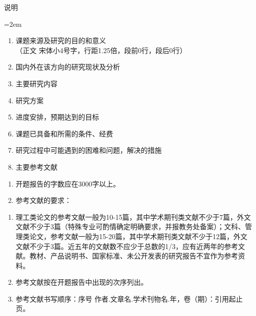 {%
\newpage

\thispagestyle{empty}
\vspace*{2em}
\begin{center}
  \heiti{}说\hspace{3em}明
\end{center}
\vspace*{40pt}
	\renewcommand{\arraystretch}{1.25}
    {\heiti{}
    \hangindent=2em
    \begin{enumerate}[leftmargin=36pt]
	\item 课题来源及研究的目的和意义\\ {\songti {}（正文  宋体小4号字，行距1.25倍，段前0行，段后0行）}
	\item 国内外在该方向的研究现状及分析
	\item 主要研究内容
	\item 研究方案
	\item 进度安排，预期达到的目标
	\item 课题已具备和所需的条件、经费
	\item 研究过程中可能遇到的困难和问题，解决的措施
	\item 主要参考文献
    \end{enumerate}
	\begin{enumerate}[leftmargin=36pt]
	\item 开题报告的字数应在3000字以上。
	\item 参考文献的要求：		
 \end{enumerate}  
\begin{enumerate}
\renewcommand{\labelenumi}{(\theenumi)} 
\songti {}
\item 理工类论文的参考文献一般为10-15篇，其中学术期刊类文献不少于7篇，外文文献不少于3篇（特殊专业可酌情确定明确要求，并报教务处备案）；文科、管理类论文，参考文献一般为15-20篇，其中学术期刊类文献不少于12篇，外文文献不少于3篇。近五年的文献数不应少于总数的1/3，应有近两年的参考文献。教材、产品说明书、国家标准、未公开发表的研究报告不宜作为参考资料。
\item 参考文献按在开题报告中出现的次序列出。
\item 参考文献书写顺序：序号 作者.文章名.学术刊物名.年，卷（期）：引用起止页。
 \end{enumerate}  
}  
      
	\renewcommand{\arraystretch}{1}
    \clearpage
}

\makeatother